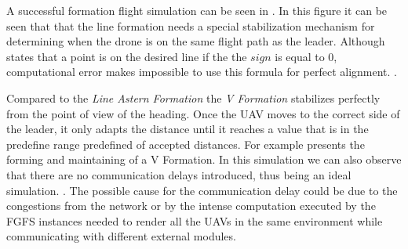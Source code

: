 A successful formation flight simulation can be seen in .
In this figure it can be seen that that the line formation needs a special stabilization
mechanism for determining when the drone is on the same flight path as the leader.
Although  states that a point
is on the desired line if the the $sign$ is equal to 0, computational error
makes impossible to use this formula for perfect alignment. 
. 

Compared to the \textit{Line Astern Formation} the \textit{V Formation} stabilizes 
perfectly from the point of view of the heading. Once the UAV moves to the 
correct side of the leader, it only adapts the distance until it reaches a value
that is in the predefine range predefined of accepted distances. For example
 presents the forming and maintaining of a V
Formation. In this simulation we can also observe that there are no communication
delays introduced, thus being an ideal simulation.
. 
\newpage
The possible cause for the communication delay could be due to the 
congestions from the network or by the intense computation executed by the FGFS
instances needed to render all the UAVs in the same environment while communicating
with different external modules.


